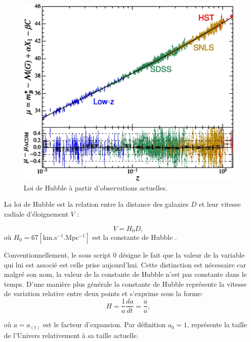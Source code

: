 \begin{figure}[bth]
        \includegraphics[width=.9\linewidth]{img/01/hubble_law.jpg} 
        \caption[Loi de Hubble]{Loi de Hubble à partir d'observations actuelles. 
        }
 		\label{fig:hubble_law}
\end{figure}

La loi de Hubble est la relation entre la distance des galaxies $D$ et leur vitesse radiale d'éloignement $V$ : %

\begin{equation}
V = H_0 D,
\end{equation}
où $H_0 = 67 \mathrm{ \left[ km.s^{-1}.Mpc^{-1} \right ] }$ est la constante de Hubble \citep{planck_collaboration_planck_2016}.

Conventionnellement, le sous script $0$ désigne le fait que la valeur de la variable qui lui est associé est celle prise aujourd'hui.
Cette distinction est nécessaire car malgré son nom, la valeur de la constante de Hubble n'est pas constante dans le temps.
D'une manière plus générale la constante de Hubble représente la vitesse de variation relative entre deux points et s'exprime sous la forme:
\begin{equation}
H=\frac{1}{a} \frac{da}{dt} = \frac{\dot{a}}{a},
\end{equation}

où $a = a_{(t)}$ est le facteur d'expansion.
Par définition $a_0 = 1$,  représente la taille de l'Univers relativement à sa taille actuelle.

